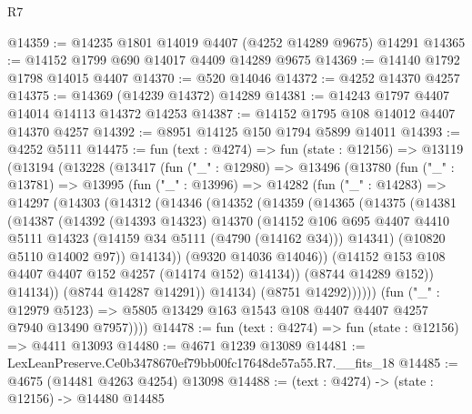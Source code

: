 \begin{lexlean}{R7}
\begin{coremodule}
@14359 := @14235 @1801 @14019 @4407 (@4252 @14289 @9675) @14291
@14365 := @14152 @1799 @690 @14017 @4409 @14289 @9675
@14369 := @14140 @1792 @1798 @14015 @4407
@14370 := @520 @14046
@14372 := @4252 @14370 @4257
@14375 := @14369 (@14239 @14372) @14289
@14381 := @14243 @1797 @4407 @14014 @14113 @14372 @14253
@14387 := @14152 @1795 @108 @14012 @4407 @14370 @4257
@14392 := @8951 @14125 @150 @1794 @5899 @14011
@14393 := @4252 @5111
@14475 := fun (text : @4274) =>
  fun (state : @12156) =>
  @13119
    (@13194
      (@13228
        (@13417
          (fun ("_" : @12980) =>
          @13496
            (@13780
              (fun ("_" : @13781) =>
              @13995
                (fun ("_" : @13996) =>
                @14282
                  (fun ("_" : @14283) =>
                  @14297
                    (@14303
                      (@14312
                        (@14346
                          (@14352
                            (@14359
                              (@14365
                                (@14375
                                  (@14381
                                    (@14387
                                      (@14392
                                        (@14393 @14323)
                                        @14370
                                        (@14152
                                          @106
                                          @695
                                          @4407
                                          @4410
                                          @5111
                                          @14323
                                          (@14159 @34 @5111 (@4790 (@14162 @34)))
                                          @14341)
                                        (@10820 @5110 @14002 @97))
                                      @14134))
                                  (@9320 @14036 @14046))
                                (@14152 @153 @108 @4407 @4407 @152 @4257 (@14174 @152) @14134))
                              (@8744 @14289 @152))
                            @14134))
                        (@8744 @14287 @14291))
                      @14134)
                    (@8751 @14292))))))
          (fun ("_" : @12979 @5123) =>
          @5805 @13429 @163 @1543 @108 @4407 @4407 @4257 @7940 @13490 @7957))))
@14478 := fun (text : @4274) => fun (state : @12156) => @4411 @13093
@14480 := @4671 @1239 @13089
@14481 := LexLeanPreserve.Ce0b3478670ef79bb00fc17648de57a55.R7.__fits_18
@14485 := @4675 (@14481 @4263 @4254) @13098
@14488 := (text : @4274) -> (state : @12156) -> @14480 @14485

\end{coremodule}
\end{lexlean}
